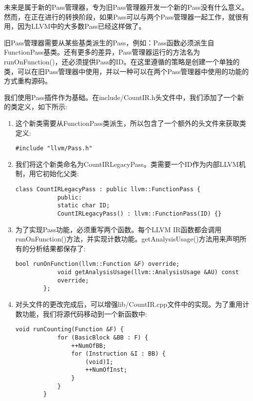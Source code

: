 
未来是属于新的Pass管理器，专为旧Pass管理器开发一个新的Pass没有什么意义。然而，在正在进行的转换阶段，如果Pass可以与两个Pass管理器一起工作，就很有用，因为LLVM中的大多数Pass已经这样做了。\par

旧Pass管理器需要从某些基类派生的Pass，例如：Pass函数必须派生自FunctionPass基类。还有更多的差异，Pass管理器运行的方法名为runOnFunction()，还必须提供Pass的ID。在这里遵循的策略是创建一个单独的类，可以在旧Pass管理器中使用，并以一种可以在两个Pass管理器中使用的功能的方式重构源码。\par

我们使用Pass插件作为基础。在include/CountIR.h头文件中，我们添加了一个新的类定义，如下所示:\par

\begin{enumerate}
	\item 这个新类需要从FunctionPass类派生，所以包含了一个额外的头文件来获取类定义:
	\begin{lstlisting}[caption={}]
		#include "llvm/Pass.h"
	\end{lstlisting}
	
	\item 我们将这个新类命名为CountIRLegacyPass。类需要一个ID作为内部LLVM机制，用它初始化父类:
	\begin{lstlisting}[caption={}]
		class CountIRLegacyPass : public llvm::FunctionPass {
			public:
			static char ID;
			CountIRLegacyPass() : llvm::FunctionPass(ID) {}
		\end{lstlisting}
		
		\item 为了实现Pass功能，必须重写两个函数。每个LLVM IR函数都会调用runOnFunction()方法，并实现计数功能。getAnalysisUsage()方法用来声明所有的分析结果都保存了:
		\begin{lstlisting}[caption={}]
			bool runOnFunction(llvm::Function &F) override;
			void getAnalysisUsage(llvm::AnalysisUsage &AU) const 
			override;
		};
	\end{lstlisting}
	
	\item 对头文件的更改完成后，可以增强lib/CountIR.cpp文件中的实现。为了重用计数功能，我们将源代码移动到一个新函数中:
	\begin{lstlisting}[caption={}]
		void runCounting(Function &F) {
			for (BasicBlock &BB : F) {
				++NumOfBB;
				for (Instruction &I : BB) {
					(void)I;
					++NumOfInst;
				}
			}
		}
	\end{lstlisting}
	

\end{enumerate}
